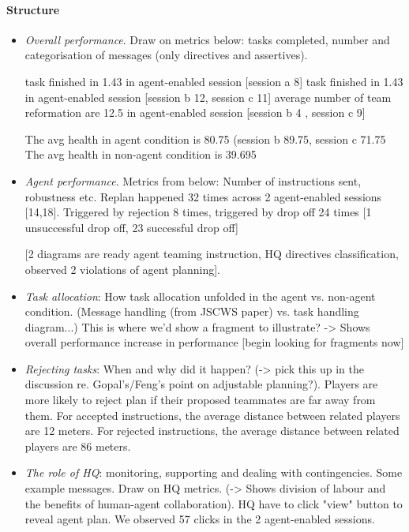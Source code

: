 \paragraph{Structure}
\begin{itemize}
\item  \textit{Overall performance}. Draw on metrics below: tasks completed, number and categorisation of messages (only directives and assertives).


task finished in 1.43 in agent-enabled session [session a 8] 
task finished in 1.43 in agent-enabled session [session b 12, session c 11]
average number of team reformation are 12.5 in agent-enabled session [session b 4 , session c 9]

The avg health in agent condition is 80.75 (session b 89.75, session c 71.75
The avg health in non-agent condition is 39.695

\item \textit{Agent performance}. Metrics from below: Number of instructions sent, robustness etc. 
Replan happened 32 times across 2 agent-enabled sessions [14,18]. Triggered by rejection 8 times, triggered by drop off 24 times [1 unsuccessful drop off, 23 successful drop off]


[2 diagrams are ready agent teaming instruction, HQ directives classification, observed 2 violations of agent planning]. 




\item \textit{Task allocation}: How task allocation unfolded in the agent vs. non-agent condition. (Message handling (from JSCWS paper) vs. task handling diagram...) This is where we'd show a fragment to illustrate? -> Shows overall performance increase in performance
[begin looking for fragments now]


\item \textit{Rejecting tasks}: When and why did it happen? (-> pick this up in the discussion re. Gopal's/Feng's point on adjustable planning?). 
Players are more likely to reject plan if their proposed teammates are far away from them.
For accepted instructions, the average distance between related players are 12 meters.
For rejected instructions, the average distance between related players are 86 meters.

\item \textit{The role of HQ}: monitoring, supporting and dealing with contingencies. Some example messages. Draw on HQ metrics. (-> Shows division of labour and the benefits of human-agent collaboration).
HQ have to click "view" button to reveal agent plan. We observed 57 clicks in the 2 agent-enabled sessions. 

\end{itemize} 
 
